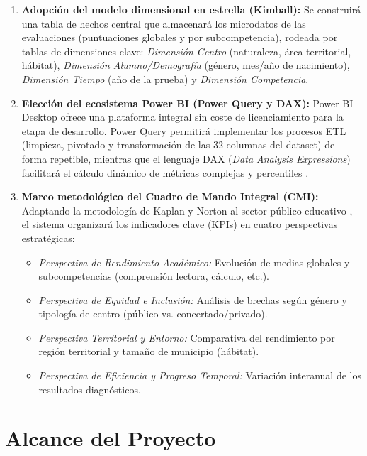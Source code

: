 \documentclass[12pt, a4paper, twoside]{report}
\begin{document}
\begin{enumerate}
    \item \textbf{Adopción del modelo dimensional en estrella (Kimball):} Se construirá una tabla de hechos central que almacenará los microdatos de las evaluaciones (puntuaciones globales y por subcompetencia), rodeada por tablas de dimensiones clave: \textit{Dimensión Centro} (naturaleza, área territorial, hábitat), \textit{Dimensión Alumno/Demografía} (género, mes/año de nacimiento), \textit{Dimensión Tiempo} (año de la prueba) y \textit{Dimensión Competencia}.
    \item \textbf{Elección del ecosistema Power BI (Power Query y DAX):} Power BI Desktop ofrece una plataforma integral sin coste de licenciamiento para la etapa de desarrollo. Power Query permitirá implementar los procesos ETL (limpieza, pivotado y transformación de las 32 columnas del dataset) de forma repetible, mientras que el lenguaje DAX (\textit{Data Analysis Expressions}) facilitará el cálculo dinámico de métricas complejas y percentiles \cite{ferrari2016definitive}.
    \item \textbf{Marco metodológico del Cuadro de Mando Integral (CMI):} Adaptando la metodología de Kaplan y Norton al sector público educativo \cite{niven2008balanced}, el sistema organizará los indicadores clave (KPIs) en cuatro perspectivas estratégicas:
    \begin{itemize}
        \item \textit{Perspectiva de Rendimiento Académico:} Evolución de medias globales y subcompetencias (comprensión lectora, cálculo, etc.).
        \item \textit{Perspectiva de Equidad e Inclusión:} Análisis de brechas según género y tipología de centro (público vs. concertado/privado).
        \item \textit{Perspectiva Territorial y Entorno:} Comparativa del rendimiento por región territorial y tamaño de municipio (hábitat).
        \item \textit{Perspectiva de Eficiencia y Progreso Temporal:} Variación interanual de los resultados diagnósticos.
    \end{itemize}
\end{enumerate}



\chapter{Alcance del Proyecto}
\end{document}
